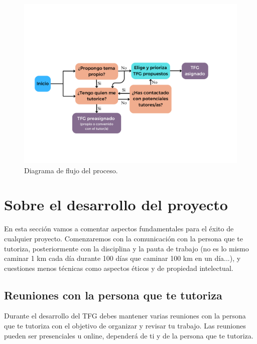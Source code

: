 \begin{figure}[!ht]
\centering
    \includegraphics[scale=0.5]{images/DecisionTFG.pdf}
    \caption{Diagrama de flujo del proceso.}\label{fg_diagrama_proceso}
\end{figure}


\section{Sobre el desarrollo del proyecto}


En esta sección vamos a comentar aspectos fundamentales para el éxito de cualquier proyecto. Comenzaremos con la comunicación con la persona que te tutoriza, posteriormente con la disciplina y la pauta de trabajo (no es lo mismo caminar 1 km cada día durante 100 días que caminar 100 km en un día...), y cuestiones menos técnicas como aspectos éticos y de propiedad intelectual.

\subsection{Reuniones con la persona que te tutoriza}%

Durante el desarrollo del TFG debes mantener varias reuniones con la persona que te tutoriza con el objetivo de organizar y revisar tu trabajo. Las reuniones pueden ser presenciales u online, dependerá de ti y de la persona que te tutoriza.


